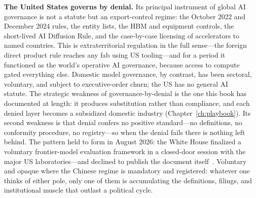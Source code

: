 \textbf{The United States governs by denial.} Its principal instrument of global AI governance is not a statute but an export-control regime: the October 2022 and December 2024 rules, the entity lists, the HBM and equipment controls, the short-lived AI Diffusion Rule, and the case-by-case licensing of accelerators to named countries. This is extraterritorial regulation in the full sense---the foreign direct product rule reaches any fab using US tooling---and for a period it functioned as the world's operative AI governance, because access to compute gated everything else. Domestic model governance, by contrast, has been sectoral, voluntary, and subject to executive-order churn; the US has no general AI statute. The strategic weakness of governance-by-denial is the one this book has documented at length: it produces substitution rather than compliance, and each denied layer becomes a subsidized domestic industry (Chapter~\ref{ch:playbook}). Its second weakness is that denial confers no positive standard---no definitions, no conformity procedure, no registry---so when the denial fails there is nothing left behind. The pattern held to form in August 2026: the White House finalized a voluntary frontier-model evaluation framework in a closed-door session with the major US laboratories---and declined to publish the document itself~\cite{wh-framework}. Voluntary and opaque where the Chinese regime is mandatory and registered: whatever one thinks of either pole, only one of them is accumulating the definitions, filings, and institutional muscle that outlast a political cycle.

